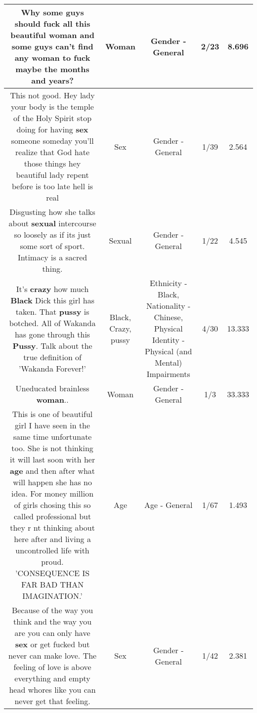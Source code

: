 \documentclass[11pt]{article}
\newlength\mylength
\begin{document}
\begin{center}
\begin{longtable}{|C{.65\mylength}|C{.30\mylength}|C{.12\mylength}|C{.12\mylength}|C{.12\mylength}|}
  \small Why some guys should fuck all this beautiful \textbf{woman} and some guys can't find any \textbf{woman} to fuck maybe the months and years?\normalsize   & Woman & Gender - General & 2/23 & 8.696 \\  \hline
  \small This not good. Hey lady your body is the temple of the Holy Spirit stop doing for having \textbf{sex} someone someday you'll realize that God hate those things hey beautiful lady repent before is too late hell is real\normalsize   & Sex & Gender - General & 1/39 & 2.564 \\  \hline
  \small Disgusting how she talks about \textbf{sexual} intercourse so loosely as if its just some sort of sport.  Intimacy is a sacred thing.\normalsize   & Sexual & Gender - General & 1/22 & 4.545 \\  \hline
  \small It's \textbf{crazy} how much \textbf{Black} Dick this girl has taken.  That \textbf{pussy} is botched. All of Wakanda has gone through this \textbf{Pussy}. Talk about the true definition of 'Wakanda Forever!'\normalsize   & Black, Crazy, pussy & Ethnicity - Black, Nationality - Chinese, Physical Identity - Physical (and Mental) Impairments & 4/30 & 13.333 \\  \hline
  \small Uneducated brainless \textbf{woman}..\normalsize   & Woman & Gender - General & 1/3 & 33.333 \\  \hline
  \small This is one of beautiful girl I have seen in the same time unfortunate too. She is not thinking it will last soon with her \textbf{age} and then after what will happen she has no idea. For money million of girls chosing this so called professional but they r nt thinking about here after and living a uncontrolled life with proud. 'CONSEQUENCE IS FAR BAD THAN IMAGINATION.'\normalsize   & Age & Age - General & 1/67 & 1.493 \\  \hline
  \small Because of the way you think and the way you are you can only have \textbf{sex} or get fucked but never can make love. The feeling of love is above everything and empty head whores like you can never get that feeling.\normalsize   & Sex & Gender - General & 1/42 & 2.381 \\  \hline

\end{longtable}
\end{center}
\end{document}
